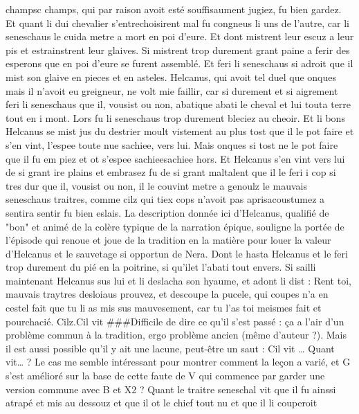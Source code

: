 \documentclass{article}
\begin{document}
\begin{pages}
   champsc champs, 
   qui par raison avoit esté souffisaument jugiez, fu bien gardez. Et quant li dui chevalier s'entrechoisirent mal fu congneus li uns 
   de l’autre, car li seneschaus le cuida metre a mort en poi d’eure.
   Et dont mistrent leur escuz a leur pis et estrainstrent leur glaives. Si mistrent trop durement grant paine a ferir des esperons que 
   en poi d’eure se furent assemblé. Et feri li seneschaus si adroit que il mist son 
   glaive en pieces et en asteles. Helcanus,
   qui avoit tel duel que onques mais il n’avoit eu greigneur, ne volt mie faillir, car
   si durement et si aigrement feri 
   li seneschaus que il, 
   vousist ou non, abatique abati
   le cheval et lui 
   touta terre tout en i mont.
   Lors fu li seneschaus
   trop durement bleciez au cheoir.
   Et li bons Helcanus se mist jus du destrier
   moult vistement au plus tost que il le pot faire et s’en vint, l’espee toute nue 
   sachiee, vers lui. Mais onques si tost ne le pot faire que il fu em piez et ot s’espee 
   sachieesachiee hors. Et Helcanus s’en 
   vint vers lui de si grant ire plains et embrasez
   fu de si grant maltalent que il le feri i cop si tres dur que 
   il, vousist ou non, il le couvint metre a genoulz
   le mauvais seneschaus
   traitres, comme cilz qui tiex cops n’avoit pas aprisacoustumez
   a sentira sentir fu bien eslais.
   La description donnée ici d'Helcanus, qualifié de "bon" et animé de la colère typique de la
   narration épique, souligne la portée de l'épisode qui renoue et joue de la tradition en la matière pour louer la valeur 
   d'Helcanus et le sauvetage si opportun de Nera.
   Dont le hasta Helcanus et le feri
   trop durement du pié en la poitrine,
   si qu’ilet l’abati tout envers. 
   Si sailli maintenant Helcanus sus lui
   et li deslacha son hyaume, et adont li dist :
   Rent toi, mauvais traytres desloiaus prouvez, 
      et descoupe la pucele, qui coupes n’a en cestel 
      fait que tu li as mis sus mauvesement, car tu l’as toi meismes 
      fait et pourchacié. 
   Cilz.Cil vit
   ###Difficile de dire ce qu’il s’est passé : ça a l’air d’un problème commun à la tradition, 
      ergo problème ancien (même d’auteur ?). Mais il est aussi possible qu’il y ait une lacune, peut-être un saut : 
      Cil vit … Quant vit… ? Le cas me semble intéressant pour 
      montrer comment la leçon a varié, et G s'est amélioré sur la base de cette faute de V qui commence par garder 
      une version commune avec B et X2 ?
   Quant le traitre seneschal vit que il fu ainssi atrapé
      et mis au dessouz et que il ot le chief tout nu et que il li couperoit

\end{pages}
\end{document}

